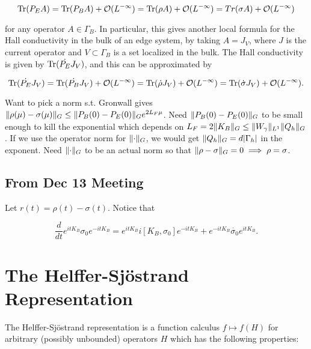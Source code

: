 \documentclass[12pt, letterpaper]{article}
\begin{document}
\[\text{Tr}(P_E A) = \text{Tr}(P_B A) + \mathcal{O}(L^{-\infty}) = \text{Tr}(\rho A) + \mathcal{O}(L^{-\infty}) = Tr(\sigma A) + \mathcal{O}(L^{-\infty}) \]

for any operator $A\in\Gamma_B$. In particular, this gives another local formula for the Hall conductivity in the bulk of an edge system, by taking $A = J_V$, where $J$ is the current operator and $V \subset \Gamma_B$ is a set localized in the bulk. The Hall conductivity is given by $\text{Tr}(\dot{P_E}J_V)$, and this can be approximated by

\[\text{Tr}(\dot{P_E} J_V) = \text{Tr}(\dot{P_B} J_V) + \mathcal{O}(L^{-\infty}) = \text{Tr}(\dot{\rho} J_V) + \mathcal{O}(L^{-\infty}) = \text{Tr}(\dot{\sigma} J_V) + \mathcal{O}(L^{-\infty}).\]

Want to pick a norm s.t. Gronwall gives $\lVert \rho(\mu)-\sigma(\mu) \rVert_G \leq \lVert P_B(0)-P_E(0) \rVert_Ge^{2L_F\mu}$. Need $\lVert P_B(0)-P_E(0) \rVert_G$ to be small enough to kill the exponential which depends on $L_F = 2\lVert K_B \rVert_G \leq \lVert W_\gamma \rVert_{L^1}\lVert Q_h \rVert_G$. If we use the operator norm for $\lVert \cdot \rVert_G$, we would get $\lVert Q_h \rVert_G = d|\Gamma_h|$ in the exponent. Need $\lVert \cdot \rVert_G$ to be an actual norm so that $\lVert \rho-\sigma \rVert_G = 0 \implies \rho = \sigma$.

\subsection*{From Dec 13 Meeting}

Let $r(t) = \rho(t)-\sigma(t)$. Notice that 

\[\frac{d}{dt} e^{itK_B}\sigma_0e^{-itK_B} = e^{itK_B}i[K_B,\sigma_0]e^{-itK_B} + e^{-itK_B}\dot{\sigma_0}e^{itK_B}.\]

\section{The Helffer-Sj\"{o}strand Representation}

The Helffer-Sj\"{o}strand representation is a function calculus $f \mapsto f(H)$ for arbitrary (possibly unbounded) operators $H$ which has the following properties:

\begin{theorem}
\end{theorem}
\end{document}

